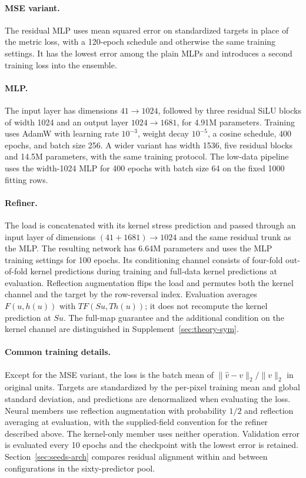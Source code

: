 \paragraph{MSE variant.} The residual MLP uses mean squared error on
standardized targets in place of the metric loss, with a 120-epoch schedule
and otherwise the same training settings. It has the lowest error among the plain MLPs and introduces a second
training loss into the ensemble.

\paragraph{MLP.} The input layer has dimensions $41\to1024$, followed by
three residual SiLU blocks of width 1024 and an output layer
$1024\to1681$, for 4.91M parameters. Training uses AdamW with learning
rate $10^{-3}$, weight decay $10^{-5}$, a cosine schedule, 400 epochs, and
batch size 256. A wider variant has width 1536, five residual blocks and
14.5M parameters, with the same training protocol. The low-data pipeline
uses the width-1024 MLP for 400 epochs with batch size 64 on the fixed
1000 fitting rows.

\paragraph{Refiner.} The load is concatenated with its kernel stress
prediction and passed through an input layer of dimensions
$(41+1681)\to1024$ and the same residual trunk as the MLP. The resulting
network has 6.64M parameters and uses the MLP training settings for 100
epochs. Its conditioning channel consists of four-fold out-of-fold kernel
predictions during training and full-data kernel predictions at evaluation.
Reflection
augmentation flips the load and permutes both the kernel channel and the target
by the row-reversal index. Evaluation averages $F(u,h(u))$ with
$T F(Su,T h(u))$; it does not recompute the kernel prediction at $Su$.
The full-map guarantee and the additional
condition on the kernel channel are distinguished in
Supplement~\ref{sec:theory-sym}.

\paragraph{Common training details.} Except for the MSE variant, the loss
is the batch mean of $\|\hat v-v\|_2/\|v\|_2$ in original units. Targets
are standardized by the per-pixel training mean and global standard
deviation, and predictions are denormalized when evaluating the loss.
Neural members use reflection augmentation with probability $1/2$ and
reflection averaging at evaluation, with the supplied-field convention
for the refiner described above. The kernel-only member uses neither
operation. Validation error is evaluated every 10 epochs and the checkpoint
with the lowest error is retained. Section~\ref{sec:seeds-arch} compares
residual alignment within and between configurations in the sixty-predictor
pool.

